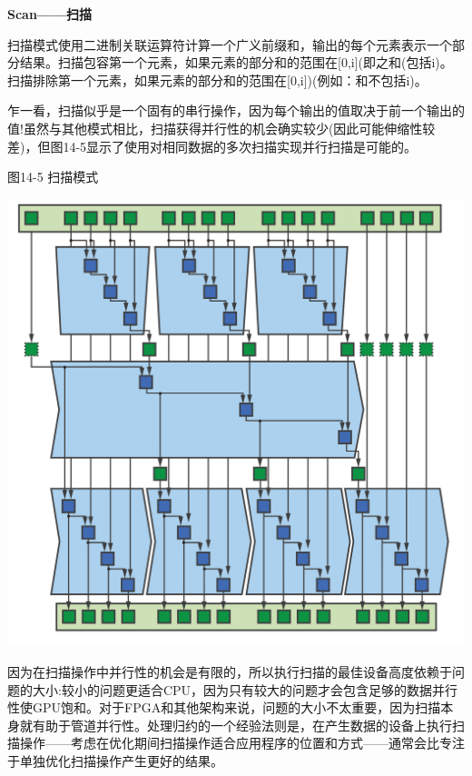 \hspace*{\fill} \par %
\textbf{Scan——扫描}

扫描模式使用二进制关联运算符计算一个广义前缀和，输出的每个元素表示一个部分结果。扫描包容第一个元素，如果元素的部分和的范围在[0,i](即之和(包括i)。扫描排除第一个元素，如果元素的部分和的范围在[0,i])(例如：和不包括i)。\par

乍一看，扫描似乎是一个固有的串行操作，因为每个输出的值取决于前一个输出的值!虽然与其他模式相比，扫描获得并行性的机会确实较少(因此可能伸缩性较差)，但图14-5显示了使用对相同数据的多次扫描实现并行扫描是可能的。\par

\hspace*{\fill} \par %
图14-5 扫描模式
\begin{center}
	\includegraphics[width=1.\textwidth]{content/chapter-14/images/5}
\end{center}

因为在扫描操作中并行性的机会是有限的，所以执行扫描的最佳设备高度依赖于问题的大小:较小的问题更适合CPU，因为只有较大的问题才会包含足够的数据并行性使GPU饱和。对于FPGA和其他架构来说，问题的大小不太重要，因为扫描本身就有助于管道并行性。处理归约的一个经验法则是，在产生数据的设备上执行扫描操作——考虑在优化期间扫描操作适合应用程序的位置和方式——通常会比专注于单独优化扫描操作产生更好的结果。\par

